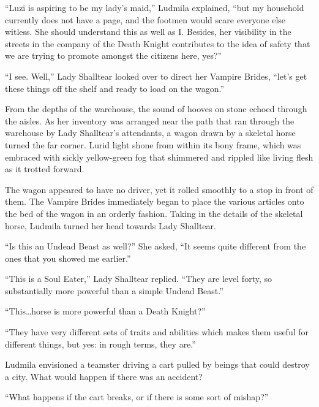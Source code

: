  

“Luzi is aspiring to be my lady’s maid,” Ludmila explained, “but my household currently does not have a page, and the footmen would scare everyone else witless. She should understand this as well as I. Besides, her visibility in the streets in the company of the Death Knight contributes to the idea of safety that we are trying to promote amongst the citizens here, yes?”

 

“I see. Well,” Lady Shalltear looked over to direct her Vampire Brides, “let’s get these things off the shelf and ready to load on the wagon.”

 

From the depths of the warehouse, the sound of hooves on stone echoed through the aisles. As her inventory was arranged near the path that ran through the warehouse by Lady Shalltear’s attendants, a wagon drawn by a skeletal horse turned the far corner. Lurid light shone from within its bony frame, which was embraced with sickly yellow-green fog that shimmered and rippled like living flesh as it trotted forward.

 

The wagon appeared to have no driver, yet it rolled smoothly to a stop in front of them. The Vampire Brides immediately began to place the various articles onto the bed of the wagon in an orderly fashion. Taking in the details of the skeletal horse, Ludmila turned her head towards Lady Shalltear.

 

“Is this an Undead Beast as well?” She asked, “It seems quite different from the ones that you showed me earlier.”

 

“This is a Soul Eater,” Lady Shalltear replied. “They are level forty, so substantially more powerful than a simple Undead Beast.”

 

“This…horse is more powerful than a Death Knight?”

 

“They have very different sets of traits and abilities which makes them useful for different things, but yes: in rough terms, they are.”

 

Ludmila envisioned a teamster driving a cart pulled by beings that could destroy a city. What would happen if there was an accident?

 

“What happens if the cart breaks, or if there is some sort of mishap?”

